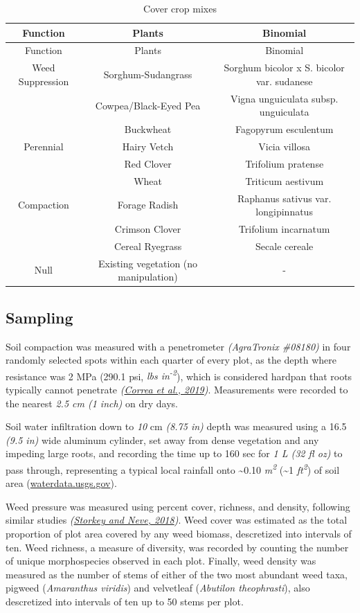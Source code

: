 \documentclass[
  12pt,
]{article}
\begin{document}
\begin{longtable}[]{@{}ccc@{}}
\caption{\label{tab:setupM}Cover crop mixes}\tabularnewline
\toprule
Function & Plants & Binomial \\
\midrule
\endfirsthead
\toprule
Function & Plants & Binomial \\
\midrule
\endhead
Weed Suppression & Sorghum-Sudangrass & Sorghum bicolor x S. bicolor var. sudanese \\
& Cowpea/Black-Eyed Pea & Vigna unguiculata subsp. unguiculata \\
& Buckwheat & Fagopyrum esculentum \\
Perennial & Hairy Vetch & Vicia villosa \\
& Red Clover & Trifolium pratense \\
& Wheat & Triticum aestivum \\
Compaction & Forage Radish & Raphanus sativus var. longipinnatus \\
& Crimson Clover & Trifolium incarnatum \\
& Cereal Ryegrass & Secale cereale \\
Null & Existing vegetation (no manipulation) & - \\
\bottomrule
\end{longtable}

\hypertarget{sampling}{%
\subsection{Sampling}\label{sampling}}

Soil compaction was measured with a penetrometer \emph{(AgraTronix \#08180)} in four randomly selected spots within each quarter of every plot, as the depth where resistance was 2 MPa (290.1 psi, \emph{lbs in\textsuperscript{-2}}), which is considered hardpan that roots typically cannot penetrate \emph{(\protect\hyperlink{ref-correa19}{Correa et al., 2019})}.
Measurements were recorded to the nearest \emph{2.5 cm (1 inch)} on dry days.

Soil water infiltration down to \emph{10}
cm \emph{(8.75 in)} depth was measured using a 16.5 \emph{(9.5 in)} wide aluminum cylinder, set away from dense vegetation and any impeding large roots, and recording the time up to 160 sec for \emph{1 L (32 fl oz)} to pass through, representing a typical local rainfall onto \textasciitilde0.10 \emph{m\textsuperscript{2}} (\textasciitilde1 \emph{ft\textsuperscript{2}}) of soil area (\url{waterdata.usgs.gov}).

Weed pressure was measured using percent cover, richness, and density, following similar studies \emph{(\protect\hyperlink{ref-storkey18}{Storkey and Neve, 2018})}.
Weed cover was estimated as the total proportion of plot area covered by any weed biomass, descretized into intervals of ten.
Weed richness, a measure of diversity, was recorded by counting the number of unique morphospecies observed in each plot.
Finally, weed density was measured as the number of stems of either of the two most abundant weed taxa, pigweed (\emph{Amaranthus viridis}) and velvetleaf (\emph{Abutilon theophrasti}), also descretized into intervals of ten up to 50 stems per plot.
\end{document}
